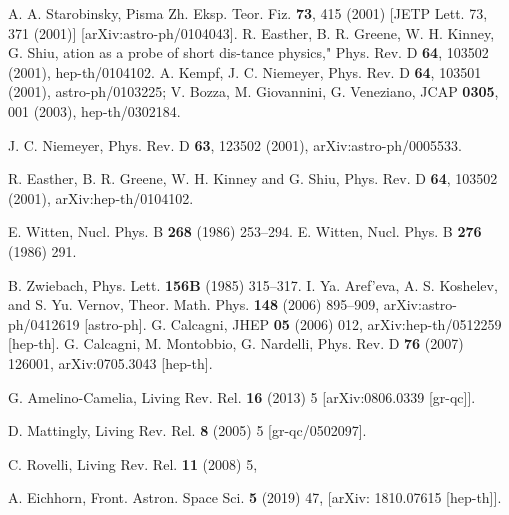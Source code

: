 \documentclass[a4paper,11pt]{article}
\begin{document}
\begin{thebibliography}{99}
 A. A. Starobinsky, Pisma Zh. Eksp. Teor. Fiz. {\bf 73}, 415 (2001) [JETP Lett. 73, 371
(2001)] [arXiv:astro-ph/0104043].
 R. Easther, B. R. Greene, W. H. Kinney, G. Shiu, %
ation as a probe of short dis-tance physics,"
Phys. Rev. D {\bf 64}, 103502 (2001), hep-th/0104102.
 A. Kempf, J. C. Niemeyer, 
Phys. Rev. D {\bf 64}, 103501 (2001), astro-ph/0103225;
V. Bozza, M. Giovannini, G. Veneziano, 
JCAP {\bf 0305}, 001 (2003), hep-th/0302184.

J. C. Niemeyer, Phys. Rev. D {\bf 63}, 123502 (2001), arXiv:astro-ph/0005533. 


R. Easther, B. R. Greene, W. H. Kinney and G. Shiu, Phys. Rev. D {\bf 64}, 103502 (2001), arXiv:hep-th/0104102.  













E. Witten, Nucl. Phys. B {\bf 268} (1986) 253–294.
E. Witten, Nucl. Phys. B {\bf 276} (1986) 291.

 B. Zwiebach, Phys. Lett. {\bf 156B} (1985) 315–317.
 I. Ya. Aref’eva, A. S. Koshelev, and S. Yu. Vernov, Theor. Math. Phys. {\bf 148} (2006) 895–909, arXiv:astro-ph/0412619 [astro-ph].
 G. Calcagni, JHEP {\bf 05} (2006) 012,
arXiv:hep-th/0512259 [hep-th].
 G. Calcagni, M. Montobbio, G. Nardelli,  Phys. Rev.
D {\bf 76} (2007) 126001, arXiv:0705.3043 [hep-th].










G. Amelino-Camelia, Living Rev. Rel. {\bf 16} (2013) 5
[arXiv:0806.0339 [gr-qc]]. 

 D. Mattingly, Living Rev. Rel. {\bf 8} (2005) 5 [gr-qc/0502097].

 C. Rovelli, 
Living Rev.  Rel.  {\bf 11} (2008) 5,  

 A. Eichhorn,  Front. Astron. Space Sci. {\bf 5} (2019) 47, [arXiv: 1810.07615 [hep-th]].



\end{thebibliography}
\end{document}
